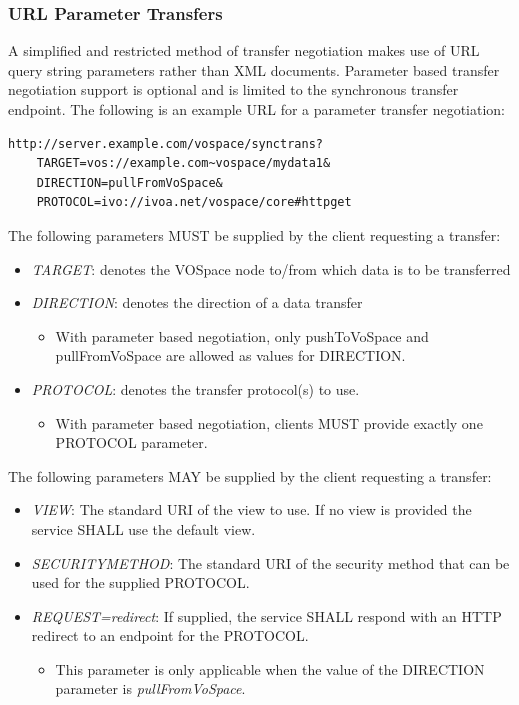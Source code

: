 \documentclass[11pt,a4paper]{ivoa}
\begin{document}
\subsubsection{URL Parameter Transfers}
\label{subsubsec:url parameter transfers}
A simplified and restricted method of transfer negotiation makes use of URL query string parameters rather than XML documents.  Parameter based transfer negotiation support is optional and is limited to the synchronous transfer endpoint.  The following is an example URL for a parameter transfer negotiation:

\begin{verbatim}
http://server.example.com/vospace/synctrans?
    TARGET=vos://example.com~vospace/mydata1&
    DIRECTION=pullFromVoSpace&
    PROTOCOL=ivo://ivoa.net/vospace/core#httpget
\end{verbatim}

The following parameters MUST be supplied by the client requesting a transfer:

\begin{itemize}
    \item \emph{TARGET}: denotes the VOSpace node to/from which data is to be transferred
    \item \emph{DIRECTION}: denotes the direction of a data transfer
        \begin{itemize}
            \item With parameter based negotiation, only pushToVoSpace and pullFromVoSpace are allowed as values for DIRECTION.
        \end{itemize}
    \item \emph{PROTOCOL}: denotes the transfer protocol(s) to use. 
        \begin{itemize}
            \item With parameter based negotiation, clients MUST provide exactly one PROTOCOL parameter.
        \end{itemize}
\end{itemize}

The following parameters MAY be supplied by the client requesting a transfer:

\begin{itemize}
    \item \emph{VIEW}: The standard URI of the view to use.  If no view is provided the service SHALL use the default view.
    \item \emph{SECURITYMETHOD}: The standard URI of the security method that can be used for the supplied PROTOCOL.
    \item \emph{REQUEST=redirect}: If supplied, the service SHALL respond with an HTTP redirect to an endpoint for the PROTOCOL.
    \begin{itemize}
        \item This parameter is only applicable when the value of the DIRECTION parameter is \emph{pullFromVoSpace}.
    \end{itemize}
\end{itemize}
\end{document}
